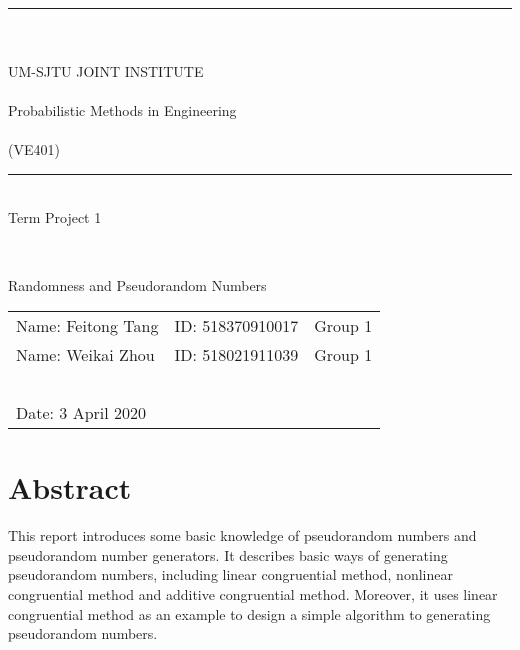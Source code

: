 \documentclass[a4paper]{article}
\begin{document}
\begin {titlepage}
\begin{large}
	\begin{center}
	~\\ ~\\ ~\\ ~\\ ~\\ ~\\ \rule[-1pt]{10.3cm}{0.05em} \\~\\UM-SJTU JOINT INSTITUTE\\~\\Probabilistic Methods in
Engineering\\~\\(VE401)	~\\ \rule[-1pt]{10.3cm}{0.05em} \vspace{7cm} \\Term Project 1
	\end{center}
\end{large}
~\\

\begin{large}
	\begin{center}
	Randomness and Pseudorandom Numbers
	\end{center}
\end{large}
\vspace{5cm}

\begin{tabular}{l l l}
	Name: Feitong Tang&ID: 518370910017&Group 1\\
	Name: Weikai Zhou&ID: 518021911039&Group 1\\
     ~\\
	Date: 3 April 2020
\end{tabular}
\end{titlepage}

\newpage

\section{Abstract}
	This report introduces some basic knowledge of pseudorandom numbers and pseudorandom number generators. It describes basic ways of generating pseudorandom numbers, including linear congruential method, nonlinear congruential method and additive congruential method. Moreover, it uses linear congruential method as an example to design a simple algorithm to generating pseudorandom numbers.
\end{document}
